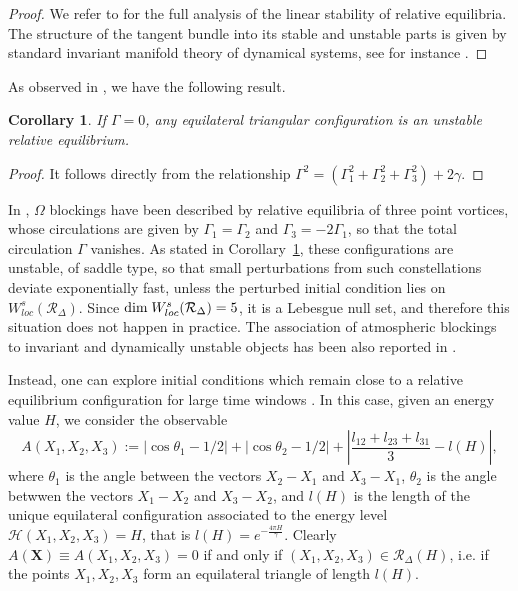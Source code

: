 \documentclass[a4paper]{article}
\numberwithin{equation}{section}
\newtheorem{corollary}[theorem]{Corollary}
\begin{document}
\begin{proof}
    We refer to \cite{Aref09} for the full analysis of the linear stability of relative equilibria. The structure of the tangent bundle into its stable and unstable parts is given by standard invariant manifold theory of dynamical systems, see for instance \cite{Wiggins94}.
\end{proof}
As observed in \cite{Aref09}, we have the following result.
\begin{corollary}
\label{CORO:equilibria_zeroGamma}
If $\Gamma=0$, any equilateral triangular configuration is an unstable relative equilibrium.
\end{corollary}
\begin{proof}
    It follows directly from the relationship $\Gamma^2 = (\Gamma_1^2+\Gamma_2^2+\Gamma_3^2) + 2\gamma$.
\end{proof}

In \cite{Muller15,Hirt18}, $\Omega$ blockings have been described by relative equilibria of three point vortices, whose circulations are given by $\Gamma_1=\Gamma_2$ and $\Gamma_3=-2\Gamma_1$, so that the total circulation $\Gamma$ vanishes. As stated in Corollary~\ref{CORO:equilibria_zeroGamma}, these configurations are unstable, of saddle type, so that small perturbations from such constellations deviate exponentially fast, unless the perturbed initial condition lies on $W^s_{loc}(\mathcal{R}_\Delta)$. Since $\textup{dim}\;W^s_{loc}(\mathcal{R}_\Delta)= 5$, it is a Lebesgue null set, and therefore this situation does not happen in practice. The association of atmospheric blockings to invariant and dynamically unstable objects has been also reported in \cite{Faranda16}.

Instead, one can explore initial conditions which remain close to a relative equilibrium configuration for large time windows \cite{Ragone18,Ragone20}. In this case, given an energy value $H$, we consider the observable
\begin{equation}
    \label{eq:observable_releq}
    A(X_1,X_2,X_3):= \left\vert \cos\theta_1 -1/2\right\vert + \left\vert \cos\theta_2 -1/2\right\vert  + \left\vert\frac{ l_{12} + l_{23} + l_{31} }{3} -l(H)\right\vert,
\end{equation}
where $\theta_1$ is the angle between the vectors $X_2-X_1$ and $X_3-X_1$, $\theta_2$ is the angle betwwen the vectors $X_1-X_2$ and $X_3-X_2$, and $l(H)$ is the length of the unique equilateral configuration associated to the energy level $\mathcal{H}(X_1,X_2,X_3)=H$, that is $l(H)=e^{-\frac{4\pi H}{\gamma}}$. Clearly $A(\bm{X})\equiv A(X_1,X_2,X_3)=0$ if and only if $(X_1,X_2,X_3)\in\mathcal{R}_\Delta(H)$, i.e. if the points $X_1,X_2,X_3$ form an equilateral triangle of length $l(H)$. 
\end{document}
